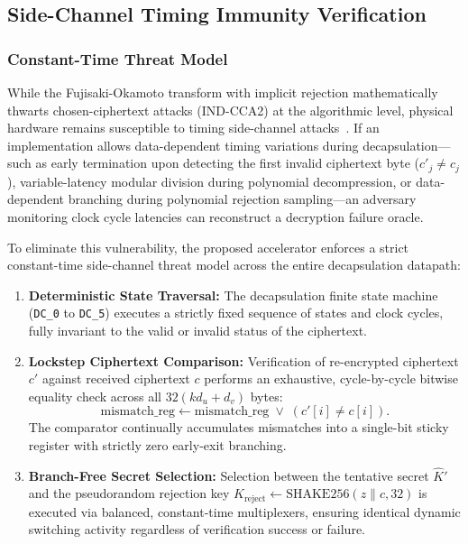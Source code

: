 \subsection{Side-Channel Timing Immunity Verification}
\label{sec:results_side_channel}

\subsubsection{Constant-Time Threat Model}
While the Fujisaki-Okamoto transform with implicit rejection mathematically thwarts chosen-ciphertext attacks (IND-CCA2) at the algorithmic level, physical hardware remains susceptible to timing side-channel attacks~\cite{kocher1996, bleichenbacher1998}. If an implementation allows data-dependent timing variations during decapsulation---such as early termination upon detecting the first invalid ciphertext byte ($c'_j \neq c_j$), variable-latency modular division during polynomial decompression, or data-dependent branching during polynomial rejection sampling---an adversary monitoring clock cycle latencies can reconstruct a decryption failure oracle.

To eliminate this vulnerability, the proposed accelerator enforces a strict constant-time side-channel threat model across the entire decapsulation datapath:
\begin{enumerate}
    \item \textbf{Deterministic State Traversal:} The decapsulation finite state machine (\texttt{DC\_0} to \texttt{DC\_5}) executes a strictly fixed sequence of states and clock cycles, fully invariant to the valid or invalid status of the ciphertext.
    \item \textbf{Lockstep Ciphertext Comparison:} Verification of re-encrypted ciphertext $c'$ against received ciphertext $c$ performs an exhaustive, cycle-by-cycle bitwise equality check across all $32(kd_u + d_v)$ bytes:
    \begin{equation}
    \label{eq:mismatch_acc}
    \text{mismatch\_reg} \leftarrow \text{mismatch\_reg} \;\lor\; (c'[i] \neq c[i]).
    \end{equation}
    The comparator continually accumulates mismatches into a single-bit sticky register with strictly zero early-exit branching.
    \item \textbf{Branch-Free Secret Selection:} Selection between the tentative secret $\hat{K}'$ and the pseudorandom rejection key $K_{\text{reject}} \leftarrow \text{SHAKE256}(z \parallel c, 32)$ is executed via balanced, constant-time multiplexers, ensuring identical dynamic switching activity regardless of verification success or failure.
\end{enumerate}

